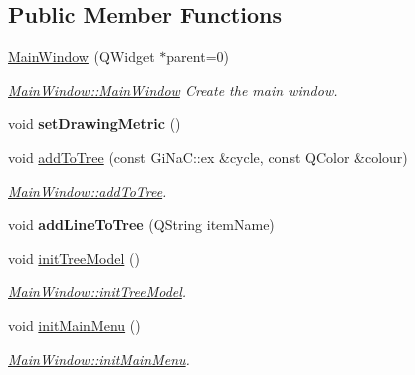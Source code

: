 \subsection*{Public Member Functions}
\begin{DoxyCompactItemize}
\item 
\mbox{\hyperlink{class_main_window_a8b244be8b7b7db1b08de2a2acb9409db}{Main\+Window}} (Q\+Widget $\ast$parent=0)
\begin{DoxyCompactList}\small\item\em \mbox{\hyperlink{class_main_window_a8b244be8b7b7db1b08de2a2acb9409db}{Main\+Window\+::\+Main\+Window}} Create the main window. \end{DoxyCompactList}\item 
\mbox{\label{class_main_window_af7d2eb4ee3fb3cc4f0b83deffdb81ae8}} 
void {\bfseries set\+Drawing\+Metric} ()
\item 
void \mbox{\hyperlink{class_main_window_a816f983db7e31a8a3e8376538b44804f}{add\+To\+Tree}} (const Gi\+Na\+C\+::ex \&cycle, const Q\+Color \&colour)
\begin{DoxyCompactList}\small\item\em \mbox{\hyperlink{class_main_window_a816f983db7e31a8a3e8376538b44804f}{Main\+Window\+::add\+To\+Tree}}. \end{DoxyCompactList}\item 
\mbox{\label{class_main_window_ad322f29d75b06348ee43ce911a1cc36f}} 
void {\bfseries add\+Line\+To\+Tree} (Q\+String item\+Name)
\item 
void \mbox{\hyperlink{class_main_window_a3e45090789e16c49079857ab0617b239}{init\+Tree\+Model}} ()
\begin{DoxyCompactList}\small\item\em \mbox{\hyperlink{class_main_window_a3e45090789e16c49079857ab0617b239}{Main\+Window\+::init\+Tree\+Model}}. \end{DoxyCompactList}\item 
void \mbox{\hyperlink{class_main_window_ae78352e402084a7c6518e97056070677}{init\+Main\+Menu}} ()
\begin{DoxyCompactList}\small\item\em \mbox{\hyperlink{class_main_window_ae78352e402084a7c6518e97056070677}{Main\+Window\+::init\+Main\+Menu}}. \end{DoxyCompactList}\item 
\mbox{\label{class_main_window_a00432086a975b242f76384601785bfcb}} 

\end{DoxyCompactItemize}
